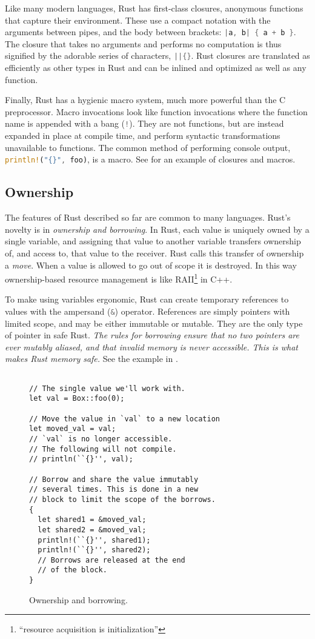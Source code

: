 Like many modern languages, Rust has first-class closures,
anonymous functions that capture their environment. These
use a compact notation with the arguments between pipes,
and the body between brackets: \lstinline[language=Rust]~|a, b| { a + b }~.
The closure that takes no arguments and performs no computation is
thus signified by the adorable series of characters, \lstinline[language=Rust]~||{}~.
Rust closures are translated as efficiently as other types
in Rust and can be inlined and optimized as well as any function.

Finally, Rust has a hygienic macro system, much more powerful than
the C preprocessor. Macro invocations look like function invocations
where the function name is appended with a bang (\lstinline[language=Rust]{!}).
They are not functions, but are instead expanded in place at compile time,
and perform syntactic transformations unavailable to functions.
The common method of performing console output, \lstinline[language=Rust]~println!("{}", foo)~,
is a macro.
See  for an example of closures and macros.

\subsection{Ownership}
The features of Rust described so far are common to many languages.
Rust's novelty is in \emph{ownership and borrowing}.
In Rust, each value is uniquely owned by a single variable, and
assigning that value to another variable transfers ownership of, and access to,
that value to the receiver. Rust calls this transfer of ownership a \emph{move}.
When a value is allowed to go out of scope
it is destroyed. In this way ownership-based resource management is
like RAII\footnote{``resource acquisition is initialization''} in C++.

To make using variables ergonomic, Rust can create temporary
references to values with the ampersand (\lstinline[language=Rust]{&})
operator. References are simply pointers with limited scope, and may be either
immutable or mutable. They are the only type of pointer in safe Rust.
\emph{The rules for borrowing ensure that no two pointers are ever mutably
aliased, and that invalid memory is never accessible.
This is what makes Rust memory safe.} See the example in .

\begin{figure}
\begin{lstlisting}

// The single value we'll work with.
let val = Box::foo(0);

// Move the value in `val` to a new location
let moved_val = val;
// `val` is no longer accessible.
// The following will not compile.
// println(``{}'', val);

// Borrow and share the value immutably
// several times. This is done in a new
// block to limit the scope of the borrows.
{
  let shared1 = &moved_val;
  let shared2 = &moved_val;
  println!(``{}'', shared1);
  println!(``{}'', shared2);
  // Borrows are released at the end
  // of the block.
}
\end{lstlisting}
  \caption{Ownership and borrowing.}
  \label{fig:own}
\end{figure}

